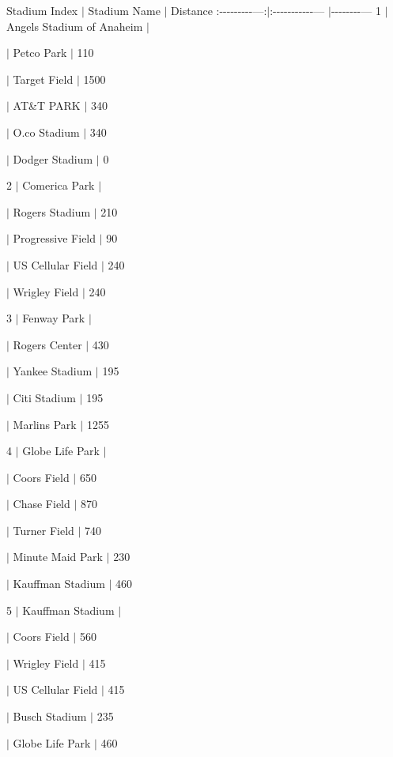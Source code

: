 Stadium Index $\vert$ Stadium Name $\vert$ Distance \+:-\/-\/-\/-\/-\/-\/-\/-\/-\/---\+:$\vert$\+:-\/-\/-\/-\/-\/-\/-\/-\/-\/-\/-\/--- $\vert$-\/-\/-\/-\/-\/-\/-\/-\/--- 1 $\vert$ Angels Stadium of Anaheim $\vert$
\begin{DoxyItemize}
\item $\vert$ Petco Park $\vert$ 110
\item $\vert$ Target Field $\vert$ 1500
\item $\vert$ AT\&T P\+A\+RK $\vert$ 340
\item $\vert$ O.\+co Stadium $\vert$ 340
\item $\vert$ Dodger Stadium $\vert$ 0
\end{DoxyItemize}

2 $\vert$ Comerica Park $\vert$
\begin{DoxyItemize}
\item $\vert$ Rogers Stadium $\vert$ 210
\item $\vert$ Progressive Field $\vert$ 90
\item $\vert$ US Cellular Field $\vert$ 240
\item $\vert$ Wrigley Field $\vert$ 240
\end{DoxyItemize}

3 $\vert$ Fenway Park $\vert$
\begin{DoxyItemize}
\item $\vert$ Rogers Center $\vert$ 430
\item $\vert$ Yankee Stadium $\vert$ 195
\item $\vert$ Citi Stadium $\vert$ 195
\item $\vert$ Marlins Park $\vert$ 1255
\end{DoxyItemize}

4 $\vert$ Globe Life Park $\vert$
\begin{DoxyItemize}
\item $\vert$ Coors Field $\vert$ 650
\item $\vert$ Chase Field $\vert$ 870
\item $\vert$ Turner Field $\vert$ 740
\item $\vert$ Minute Maid Park $\vert$ 230
\item $\vert$ Kauffman Stadium $\vert$ 460
\end{DoxyItemize}

5 $\vert$ Kauffman Stadium $\vert$
\begin{DoxyItemize}
\item $\vert$ Coors Field $\vert$ 560
\item $\vert$ Wrigley Field $\vert$ 415
\item $\vert$ US Cellular Field $\vert$ 415
\item $\vert$ Busch Stadium $\vert$ 235
\item $\vert$ Globe Life Park $\vert$ 460
\end{DoxyItemize}

